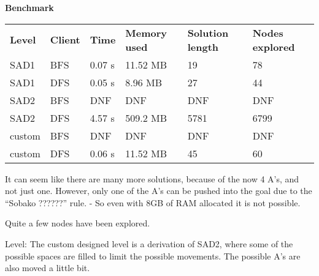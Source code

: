 \documentclass[Main]{subfiles}
\begin{document}
\textbf{Benchmark}

\begin{table}[h]
\begin{tabular}{llllll}
\rowcolor[HTML]{EFEFEF} 
\textbf{Level} & \textbf{Client} & \textbf{Time} & \textbf{Memory used} & \textbf{Solution length} & \textbf{Nodes explored} \\
SAD1           & BFS             & 0.07 s        & 11.52 MB             & 19                       & 78                      \\
SAD1           & DFS             & 0.05 s        & 8.96 MB              & 27                       & 44                      \\
SAD2           & BFS             & DNF           & DNF                  & DNF                      & DNF                     \\
SAD2           & DFS             & 4.57 s        & 509.2 MB             & 5781                     & 6799                    \\
custom         & BFS             & DNF           & DNF                  & DNF                      & DNF                     \\
custom         & DFS             & 0.06 s        & 11.52 MB             & 45                       & 60                     
\end{tabular}
\end{table}



It can seem like there are many more solutions, because of the now 4 A's, and not just one. However, only one of the A's can be pushed into the goal due to the ``Sobako ??????'' rule.
- So even with 8GB of RAM allocated it is not possible. 

Quite a few nodes have been explored.





Level:
The custom designed level is a derivation of SAD2, where some of the possible spaces are filled to limit the possible movements. The possible A's are also moved a little bit. 
\end{document}

